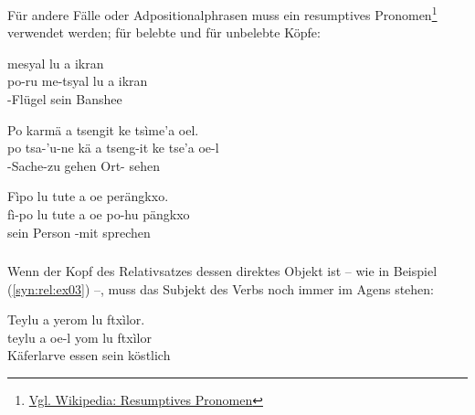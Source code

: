 \noindent Für andere Fälle oder Adpositionalphrasen muss ein resumptives Pronomen\footnote{\href{https://de.wikipedia.org/wiki/Resumptives_Pronomen}{Vgl. Wikipedia: Resumptives Pronomen}} verwendet werden;  für belebte und  für unbelebte Köpfe:

\begin{interlin} 
	\glll \Npawl{} mesyal lu a ikran \\
	po-ru me-tsyal lu a ikran \\
	 -Flügel sein  Banshee \\
\end{interlin}

\begin{interlin}
	\glll \Npawl{}Po  karmä a tsengit ke tsìme'a oel. \\
	po tsa-'u-ne kä a tseng-it ke tse'a oe-l \\
	 -Sache-zu gehen  Ort-  sehen  \\
\end{interlin}

\begin{interlin} 
	\glll Fìpo lu tute a oe  perängkxo. \\
	fì-po lu tute a oe po-hu pängkxo \\
	 sein Person   -mit sprechen \\
\end{interlin}

\subsubsection{} Wenn der Kopf des Relativsatzes dessen direktes Objekt ist -- wie in Beispiel (\ref{syn:rel:ex03}) --, muss das Subjekt des Verbs noch immer im Agens stehen: 

\begin{interlin} 
	\glll \Npawl{}Teylu a  yerom lu ftxìlor. \\
	teylu a oe-l yom lu ftxìlor \\
	Käferlarve   essen sein köstlich \\
\end{interlin}

